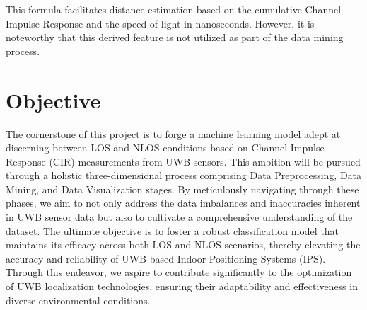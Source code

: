 This formula facilitates distance estimation based on the cumulative Channel Impulse Response and the speed of light in nanoseconds. However, it is noteworthy that this derived feature is not utilized as part of the data mining process.


\section{Objective}\label{objective}
The cornerstone of this project is to forge a machine learning model adept at discerning between LOS and NLOS conditions based on Channel Impulse Response (CIR) measurements from UWB sensors. This ambition will be pursued through a holistic three-dimensional process comprising Data Preprocessing, Data Mining, and Data Visualization stages. By meticulously navigating through these phases, we aim to not only address the data imbalances and inaccuracies inherent in UWB sensor data but also to cultivate a comprehensive understanding of the dataset. The ultimate objective is to foster a robust classification model that maintains its efficacy across both LOS and NLOS scenarios, thereby elevating the accuracy and reliability of UWB-based Indoor Positioning Systems (IPS). Through this endeavor, we aspire to contribute significantly to the optimization of UWB localization technologies, ensuring their adaptability and effectiveness in diverse environmental conditions.






